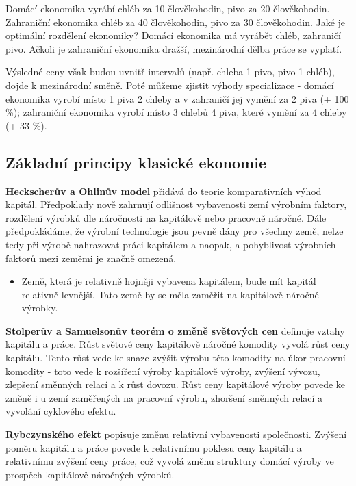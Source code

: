 \begin{example}\begin{displayquote}
Domácí ekonomika vyrábí chléb za 10 člověkohodin, pivo za 20 člověkohodin. Zahraniční ekonomika chléb za 40 člověkohodin, pivo za 30 člověkohodin. Jaké je optimální rozdělení ekonomiky? Domácí ekonomika má vyrábět chléb, zahraničí pivo. Ačkoli je zahraniční ekonomika dražší, mezinárodní dělba práce se vyplatí.

Výsledné ceny však budou uvnitř intervalů (např. chleba 1 pivo, pivo 1 chléb), dojde k mezinárodní směně. Poté můžeme zjistit výhody specializace - domácí ekonomika vyrobí místo 1 piva 2 chleby a v zahraničí jej vymění za 2 piva (+ 100 \%); zahraniční ekonomika vyrobí místo 3 chlebů 4 piva, které vymění za 4 chleby (+ 33 \%).
\end{displayquote}\end{example}

\subsection{Základní principy klasické ekonomie}

\textbf{Heckscherův a Ohlinův model} přidává do teorie komparativních výhod kapitál. Předpoklady nově zahrnují odlišnost vybavenosti zemí výrobním faktory, rozdělení výrobků dle náročnosti na kapitálově nebo pracovně náročné. Dále předpokládáme, že výrobní technologie jsou pevně dány pro všechny země, nelze tedy při výrobě nahrazovat práci kapitálem a naopak, a pohyblivost výrobních faktorů mezi zeměmi je značně omezená.

\begin{itemize}
    \item Země, která je relativně hojněji vybavena kapitálem, bude mít kapitál relativně levnější. Tato země by se měla zaměřit na kapitálově náročné výrobky.
\end{itemize}

\textbf{Stolperův a Samuelsonův teorém o změně světových cen} definuje vztahy kapitálu a práce. Růst světové ceny kapitálově náročné komodity vyvolá růst ceny kapitálu. Tento růst vede ke snaze zvýšit výrobu této komodity na úkor pracovní komodity - toto vede k rozšíření výroby kapitálově výroby, zvýšení vývozu, zlepšení směnných relací a k růst dovozu. Růst ceny kapitálové výroby povede ke změně i u zemí zaměřených na pracovní výrobu, zhoršení směnných relací a vyvolání cyklového efektu.

\textbf{Rybczynského efekt} popisuje změnu relativní vybavenosti společnosti. Zvýšení poměru kapitálu a práce povede k relativnímu poklesu ceny kapitálu a relativnímu zvýšení ceny práce, což vyvolá změnu struktury domácí výroby ve prospěch kapitálově náročných výrobků.

